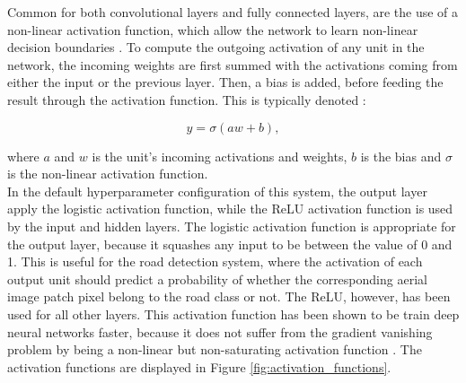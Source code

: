 Common for both convolutional layers and fully connected layers, are the use of a non-linear activation function, which allow the network to learn non-linear decision boundaries . To compute the outgoing activation of any unit in the network, the incoming weights are first summed with the activations coming from either the input or the previous layer. Then, a bias is added, before feeding the result through the activation function. This is typically denoted :

$$ y = \sigma(aw + b),$$

\noindent where $a$ and  $w$ is the unit's incoming activations and weights, $b$ is the bias and $\sigma$ is the non-linear activation function.\\

In the default hyperparameter configuration of this system, the output layer apply the logistic activation function, while the \ac{ReLU} activation function is used by the input and hidden layers. The logistic activation function is appropriate for the output layer, because it squashes any input to be between the value of 0 and 1. This is useful for the road detection system, where the activation of each output unit should predict a probability of whether the corresponding aerial image patch pixel belong to the road class or not. The \ac{ReLU}, however, has been used for all other layers. This activation function has been shown to be train deep neural networks faster, because it does not suffer from the gradient vanishing problem by being a non-linear but non-saturating activation function \citep{Krizhevsky_imagenet}.  The activation functions are displayed in Figure \ref{fig:activation_functions}.\\

